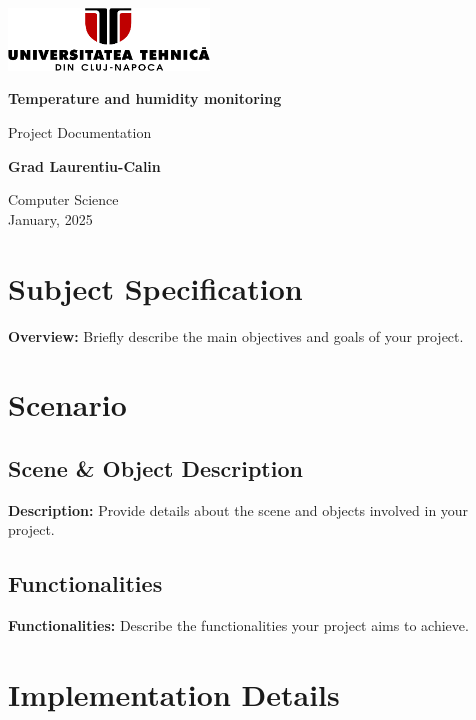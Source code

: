 \documentclass[12pt]{article}
\begin{document}
	\begin{titlepage}
		\centering
		
		\includegraphics[width=0.4\textwidth]{Resources/logo_utcn.png}\\
		\vspace*{6cm}
		
		\Huge
		\textbf{Temperature and humidity monitoring}
		
		\vspace{0.5cm}
		\Large
		Project Documentation
		
		\vspace{1.5cm}
		
		\textbf{Grad Laurentiu-Calin}\\
		
		\vfill
		
		\Large
		Computer Science\\
		January, 2025\\
		
	\end{titlepage}
	
	\newpage
	
	\tableofcontents
	
	\section{Subject Specification}
	\textbf{Overview:} Briefly describe the main objectives and goals of your project.
	
	\section{Scenario}
	\subsection{Scene \& Object Description}
	\textbf{Description:} Provide details about the scene and objects involved in your project.
	
	\subsection{Functionalities}
	\textbf{Functionalities:} Describe the functionalities your project aims to achieve.
	
	\section{Implementation Details}
\end{document}
